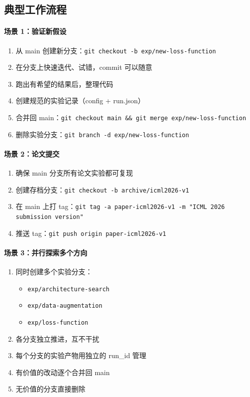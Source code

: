 \subsection{典型工作流程}

\paragraph{场景 1：验证新假设}

\begin{enumerate}
  \item 从 main 创建新分支：\texttt{git checkout -b exp/new-loss-function}
  \item 在分支上快速迭代、试错，commit 可以随意
  \item 跑出有希望的结果后，整理代码
  \item 创建规范的实验记录（config + run.json）
  \item 合并回 main：\texttt{git checkout main \&\& git merge exp/new-loss-function}
  \item 删除实验分支：\texttt{git branch -d exp/new-loss-function}
\end{enumerate}

\paragraph{场景 2：论文提交}

\begin{enumerate}
  \item 确保 main 分支所有论文实验都可复现
  \item 创建存档分支：\texttt{git checkout -b archive/icml2026-v1}
  \item 在 main 上打 tag：\texttt{git tag -a paper-icml2026-v1 -m "ICML 2026 submission version"}
  \item 推送 tag：\texttt{git push origin paper-icml2026-v1}
\end{enumerate}

\paragraph{场景 3：并行探索多个方向}

\begin{enumerate}
  \item 同时创建多个实验分支：
  \begin{itemize}
    \item \texttt{exp/architecture-search}
    \item \texttt{exp/data-augmentation}
    \item \texttt{exp/loss-function}
  \end{itemize}
  \item 各分支独立推进，互不干扰
  \item 每个分支的实验产物用独立的 run\_id 管理
  \item 有价值的改动逐个合并回 main
  \item 无价值的分支直接删除
\end{enumerate}

